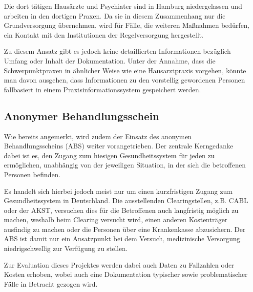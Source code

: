 Die dort tätigen Hausärzte und Psychiater sind in Hamburg niedergelassen und arbeiten in den dortigen Praxen. Da sie in diesem Zusammenhang nur die Grundversorgung übernehmen, wird für Fälle, die weiteren Maßnahmen bedürfen, ein Kontakt mit den Institutionen der Regelversorgung hergestellt.

Zu diesem Ansatz gibt es jedoch keine detaillierten Informationen bezüglich Umfang oder Inhalt der Dokumentation. Unter der Annahme, dass die Schwerpunktpraxen in ähnlicher Weise wie eine Hausarztpraxis vorgehen, könnte man davon ausgehen, dass Informationen zu den vorstellig gewordenen Personen fallbasiert in einem Praxisinformationssystem gespeichert werden. \citep{Leeden.2023}

\subsection{Anonymer Behandlungsschein}

Wie bereits angemerkt, wird zudem der Einsatz des anonymen Behandlungsscheins (\acs{ABS}) weiter vorangetrieben. Der zentrale Kerngedanke dabei ist es, den Zugang zum hiesigen Gesundheitssystem für jeden zu ermöglichen, unabhängig von der jeweiligen Situation, in der sich die betroffenen Personen befinden. 

Es handelt sich hierbei jedoch meist nur um einen kurzfristigen Zugang zum Gesundheitssystem in Deutschland. Die ausstellenden Clearingstellen, z.B. \ac{CABL} oder der \ac{AKST}, versuchen dies für die Betroffenen auch langfristig möglich zu machen, weshalb beim Clearing versucht wird, einen anderen Kostenträger ausfindig zu machen oder die Personen über eine Krankenkasse abzusichern. Der \acs{ABS} ist damit nur ein Ansatzpunkt bei dem Versuch, medizinische Versorgung niedrigschwellig zur Verfügung zu stellen.

Zur Evaluation dieses Projektes werden dabei auch Daten zu Fallzahlen oder Kosten erhoben, wobei auch eine Dokumentation typischer sowie problematischer Fälle in Betracht gezogen wird. \citep{Zanders.2022}
